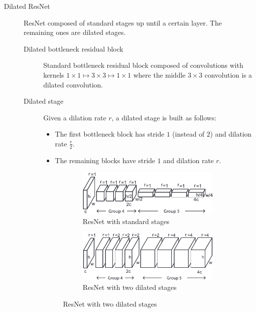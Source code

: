 \begin{description}
    \item[Dilated ResNet] 
        ResNet composed of standard stages up until a certain layer. The remaining ones are dilated stages.

        \begin{description}
            \item[Dilated bottleneck residual block]
                Standard bottleneck residual block composed of convolutions with kernels $1 \times 1 \mapsto 3 \times 3 \mapsto 1 \times 1$ where the middle $3 \times 3$ convolution is a dilated convolution.

            \item[Dilated stage]
                Given a dilation rate $r$, a dilated stage is built as follows:
                \begin{itemize}
                    \item The first bottleneck block has stride $1$ (instead of $2$) and dilation rate $\frac{r}{2}$.
                    \item The remaining blocks have stride $1$ and dilation rate $r$.
                \end{itemize}

                \begin{figure}[H]
                    \centering
                    \begin{subfigure}{0.45\linewidth}
                        \centering
                        \includegraphics[width=0.9\linewidth]{./img/_dilated_resnet_stage1.pdf}
                        \caption{ResNet with standard stages}
                    \end{subfigure}
                    \begin{subfigure}{0.45\linewidth}
                        \centering
                        \includegraphics[width=0.9\linewidth]{./img/_dilated_resnet_stage2.pdf}
                        \caption{ResNet with two dilated stages}
                    \end{subfigure}
                \end{figure}
        \end{description}


\end{description}
